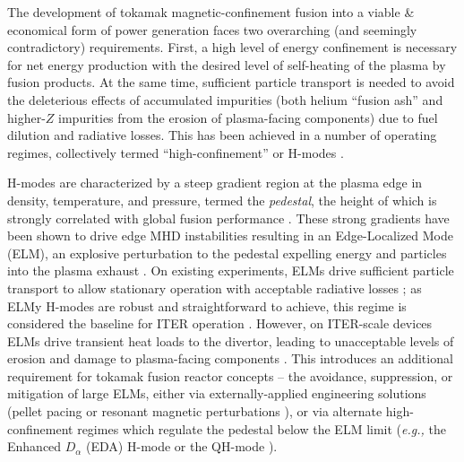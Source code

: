 \documentclass[12pt,floatfix,showpacs]{revtex4-1}
\newcommand{\eg}{\emph{e.g., }}
\begin{document}
The development of tokamak magnetic-confinement fusion into a viable \& economical form of power generation faces two overarching (and seemingly contradictory) requirements.  
First, a high level of energy confinement is necessary for net energy production with the desired level of self-heating of the plasma by fusion products.  
At the same time, sufficient particle transport is needed to avoid the deleterious effects of accumulated impurities (both helium ``fusion ash'' and higher-$Z$ impurities from the erosion of plasma-facing components) due to fuel dilution and radiative losses.  
This has been achieved in a number of operating regimes, collectively termed ``high-confinement'' or H-modes \cite{Wagner1982}.  

H-modes are characterized by a steep gradient region at the plasma edge in density, temperature, and pressure, termed the \emph{pedestal}, the height of which is strongly correlated with global fusion performance \cite{Kinsey2011}.  
These strong gradients have been shown to drive edge MHD instabilities \cite{Huysmans2005,Maget2013,Snyder2002} resulting in an Edge-Localized Mode (ELM), an explosive perturbation to the pedestal expelling energy and particles into the plasma exhaust \cite{Zohm1996}.  
On existing experiments, ELMs drive sufficient particle transport to allow stationary operation with acceptable radiative losses \cite{Keilhacker1984}; as ELMy H-modes are robust and straightforward to achieve, this regime is considered the baseline for ITER operation \cite{ITER1999,Shimada2007}.  
However, on ITER-scale devices ELMs drive transient heat loads to the divertor, leading to unacceptable levels of erosion and damage to plasma-facing components \cite{Loarte2003,Federici2003}.
This introduces an additional requirement for tokamak fusion reactor concepts -- the avoidance, suppression, or mitigation of large ELMs, either via externally-applied engineering solutions (pellet pacing \cite{Baylor2013,Lang2014} or resonant magnetic perturbations \cite{Evans2004,Evans2006}), or via alternate high-confinement regimes which regulate the pedestal below the ELM limit (\eg the Enhanced $D_\alpha$ (EDA) H-mode \cite{Greenwald1999,Hubbard2001} or the QH-mode \cite{Burrell2002,Suttrop2005}).
\end{document}
